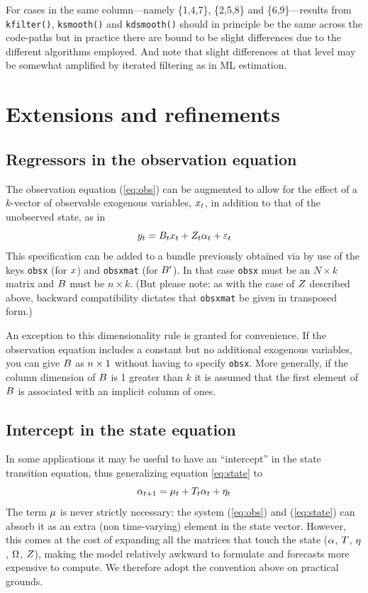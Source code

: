 For cases in the same column---namely \{1,4,7\}, \{2,5,8\} and
\{6,9\}---results from \texttt{kfilter()}, \texttt{ksmooth()} and
\texttt{kdsmooth()} should in principle be the same across the
code-paths but in practice there are bound to be slight differences
due to the different algorithms employed. And note that slight
differences at that level may be somewhat amplified by iterated
filtering as in ML estimation. 

\section{Extensions and refinements}
\label{sec:extensions}


\subsection{Regressors in the observation equation}
\label{sec:obsx}

The observation equation (\ref{eq:obs}) can be augmented to allow for
the effect of a $k$-vector of observable exogenous variables,
$x_t$, in addition to that of the unobserved state, as in
\[
  y_t = B_tx_t + Z_t \alpha_t +
  \varepsilon_t
\]
This specification can be added to a bundle previously obtained via
 by use of the keys \texttt{obsx} (for $x$) and
\texttt{obsxmat} (for $B'$). In that case \texttt{obsx} must be
an $N \times k$ matrix and $B$ must be $n \times k$. (But
please note: as with the case of $Z$ described above, backward
compatibility dictates that \texttt{obsxmat} be given in transposed
form.)

An exception to this dimensionality rule is granted for convenience.
If the observation equation includes a constant but no additional
exogenous variables, you can give $B$ as $n \times 1$
without having to specify \texttt{obsx}.  More generally, if the
column dimension of $B$ is 1 greater than $k$ it is assumed
that the first element of $B$ is associated with an implicit
column of ones.

\subsection{Intercept in the state equation}
\label{sec:stconst}

In some applications it may be useful to have an ``intercept'' in the
state transition equation, thus generalizing equation \eqref{eq:state}
to
\[
  \alpha_{t+1} = \mu_t + T_t \alpha_t + \eta_t \\
\]
The term $\mu$ is never strictly necessary: the system
(\ref{eq:obs}) and (\ref{eq:state}) can absorb it as an extra (non
time-varying) element in the state vector.  However, this comes at the
cost of expanding all the matrices that touch the state ($\alpha$,
$T$, $\eta$, $\Omega$, $Z$), making the model
relatively awkward to formulate and forecasts more expensive to
compute. We therefore adopt the convention above on practical grounds.

